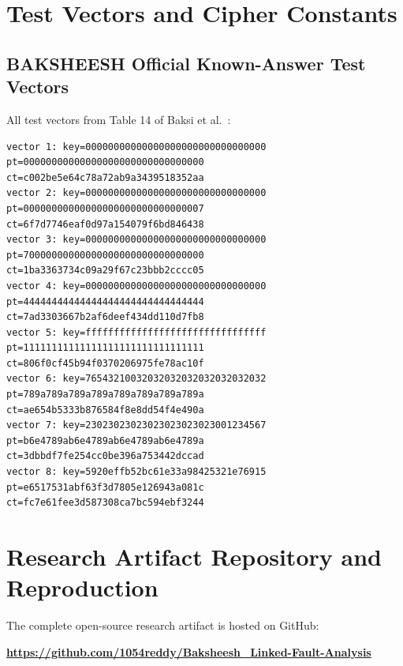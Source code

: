 \documentclass[12pt,a4paper,oneside]{report}
\begin{document}


\cleardoublepage

\appendix

\chapter{Test Vectors and Cipher Constants}
\label{app:vectors}

\section{BAKSHEESH Official Known-Answer Test Vectors}
All test vectors from Table 14 of Baksi et al.~\cite{baksi2023baksheesh}:
\begin{lstlisting}[basicstyle=\ttfamily\scriptsize]
vector 1: key=00000000000000000000000000000000  pt=00000000000000000000000000000000  ct=c002be5e64c78a72ab9a3439518352aa
vector 2: key=00000000000000000000000000000000  pt=00000000000000000000000000000007  ct=6f7d7746eaf0d97a154079f6bd846438
vector 3: key=00000000000000000000000000000000  pt=70000000000000000000000000000000  ct=1ba3363734c09a29f67c23bbb2cccc05
vector 4: key=00000000000000000000000000000000  pt=44444444444444444444444444444444  ct=7ad3303667b2af6deef434dd110d7fb8
vector 5: key=ffffffffffffffffffffffffffffffff  pt=11111111111111111111111111111111  ct=806f0cf45b94f0370206975fe78ac10f
vector 6: key=76543210032032032032032032032032  pt=789a789a789a789a789a789a789a789a  ct=ae654b5333b876584f8e8dd54f4e490a
vector 7: key=23023023023023023023023001234567  pt=b6e4789ab6e4789ab6e4789ab6e4789a  ct=3dbbdf7fe254cc0be396a753442dccad
vector 8: key=5920effb52bc61e33a98425321e76915  pt=e6517531abf63f3d7805e126943a081c  ct=fc7e61fee3d587308ca7bc594ebf3244
\end{lstlisting}

\chapter{Research Artifact Repository and Reproduction}
\label{app:reproduction}
The complete open-source research artifact is hosted on GitHub:
\begin{center}
\textbf{\url{https://github.com/1054reddy/Baksheesh_Linked-Fault-Analysis}}
\end{center}
\end{document}
